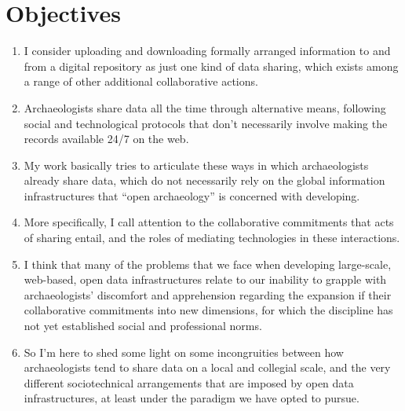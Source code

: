 \documentclass[12pt]{article}
\begin{document}
\section{Objectives}
\begin{enumerate}
  \item I consider uploading and downloading formally arranged information to and from a digital repository as just one kind of data sharing, which exists among a range of other additional collaborative actions.
  \item Archaeologists share data all the time through alternative means, following social and technological protocols that don't necessarily involve making the records available 24/7 on the web.
  \item My work basically tries to articulate these ways in which archaeologists already share data, which do not necessarily rely on the global information infrastructures that ``open archaeology'' is concerned with developing.
  \item More specifically, I call attention to the collaborative commitments that acts of sharing entail, and the roles of mediating technologies in these interactions.
  \item I think that many of the problems that we face when developing large-scale, web-based, open data infrastructures relate to our inability to grapple with archaeologists' discomfort and apprehension regarding the expansion if their collaborative commitments into new dimensions, for which the discipline has not yet established social and professional norms.
  \item So I'm here to shed some light on some incongruities between how archaeologists tend to share data on a local and collegial scale, and the very different sociotechnical arrangements that are imposed by open data infrastructures, at least under the paradigm we have opted to pursue.
\end{enumerate}
\end{document}
